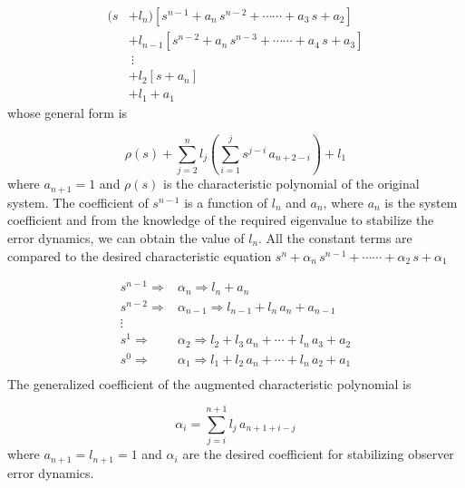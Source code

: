 \documentclass{elsarticle}
\numberwithin{equation}{section}
\begin{document}
\begin{equation}\label{polynomial}
	\begin{split}
	(s& + l_n)\left[s^{n-1}+a_n\,s^{n-2}+\cdots\cdots+a_3\,s+a_2\right]\\
	& + l_{n-1}\left[s^{n-2}+a_n\,s^{n-3}+\cdots\cdots+a_4\,s+a_3\right]\\
	&\  \vdots\\
	& + l_{2}\left[s+a_{n}\right]\\
	& + l_1+a_1
	\end{split}
\end{equation}
whose general form is 

\begin{equation}\label{generalpolynomial}
	\rho(s)+ \sum_{j=2}^{n}l_j\left(\sum_{i=1}^{j}s^{j-i}\,a_{n+2-i}\right)+ l_1
\end{equation}
where $a_{n+1}=1$ and $\rho(s)$ is the characteristic polynomial of the original system.  The coefficient of $s^{n-1}$ is a function of $l_n$ and $a_n$, where $a_n$ is the system coefficient and from the knowledge of the required eigenvalue to stabilize the error dynamics, we can obtain the value of $l_n$. All the constant terms are compared to the desired characteristic equation $s^{n}+\alpha_n\,s^{n-1}+\cdots\cdots+\alpha_2\,s+\alpha_1$

\begin{equation}
	\begin{aligned}	
	s^{n-1}\Rightarrow & \alpha_n\Longrightarrow l_n+a_n \\
	s^{n-2}\Rightarrow & \alpha_{n-1}\Longrightarrow l_{n-1}+l_n\,a_n+a_{n-1} \\
	\vdots \\
	s^1\Rightarrow & \alpha_2\Longrightarrow l_{2}+l_{3}\,a_n+\cdots + l_n\,a_3+a_2 \\
	s^0\Rightarrow & \alpha_1\Longrightarrow l_1+l_{2}\,a_n+\cdots +l_n\,a_2+a_1 \\
	\end{aligned}
\end{equation}
The generalized coefficient of the augmented characteristic polynomial is 

\begin{equation}\label{generalcoefficentobserver}
	\alpha_i=\sum_{j=i}^{n+1}l_j\, a_{n+1+i-j}
\end{equation}
where $a_{n+1}=l_{n+1}=1$ and $\alpha_i$ are the desired coefficient for stabilizing observer error dynamics. 
\end{document}
